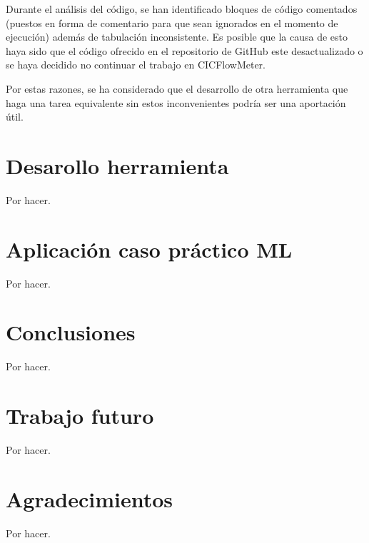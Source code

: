 \documentclass[10pt,a4paper,twoside]{article}
\begin{document}
\begin{multicols}{2}
    Durante el análisis del código, se han identificado bloques de código comentados (puestos en forma de comentario para que sean ignorados en el momento de ejecución) además de tabulación inconsistente. Es posible que la causa de esto haya sido que el código ofrecido en el repositorio de GitHub este desactualizado o se haya decidido no continuar el trabajo en CICFlowMeter.

    Por estas razones, se ha considerado que el desarrollo de otra herramienta que haga una tarea equivalente sin estos inconvenientes podría ser una aportación útil.

    \section{Desarollo herramienta}

    Por hacer.

    \section{Aplicación caso práctico ML}

    Por hacer.

    \section{Conclusiones}

    Por hacer.

    \section{Trabajo futuro}

    Por hacer.

    \section{Agradecimientos}

    Por hacer.

    

\end{multicols}
\end{document}
